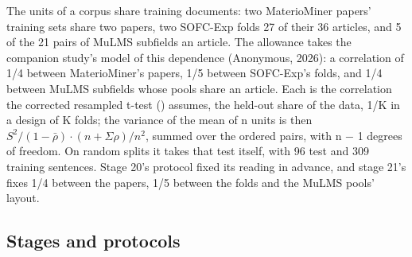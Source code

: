 \documentclass[11pt,a4paper]{article}
\begin{document}
The units of a corpus share training documents: two MaterioMiner papers'
training sets share two papers, two SOFC-Exp folds 27 of their 36
articles, and 5 of the 21 pairs of MuLMS subfields an article. The
allowance takes the companion study's model of this dependence (Anonymous,
2026): a correlation of 1/4 between MaterioMiner's papers, 1/5 between
SOFC-Exp's folds, and 1/4 between MuLMS subfields whose pools share an
article. Each is the correlation the corrected resampled t-test
(\citealp{nadeau2003inference}) assumes, the held-out share of the data, 1/K in a
design of K folds; the variance of the mean of n units is then
\(S^2/(1-\bar{\rho})\cdot(n+\Sigma\rho)/n^2\), summed over the ordered pairs, with n − 1 degrees
of freedom. On random splits it takes that test itself, with 96 test and
309 training sentences. Stage 20's protocol fixed its reading in advance,
and stage 21's fixes 1/4 between the papers, 1/5 between the folds and
the MuLMS pools' layout.

\hypertarget{stages-and-protocols}{%
\subsection{Stages and protocols}\label{stages-and-protocols}}
\end{document}

